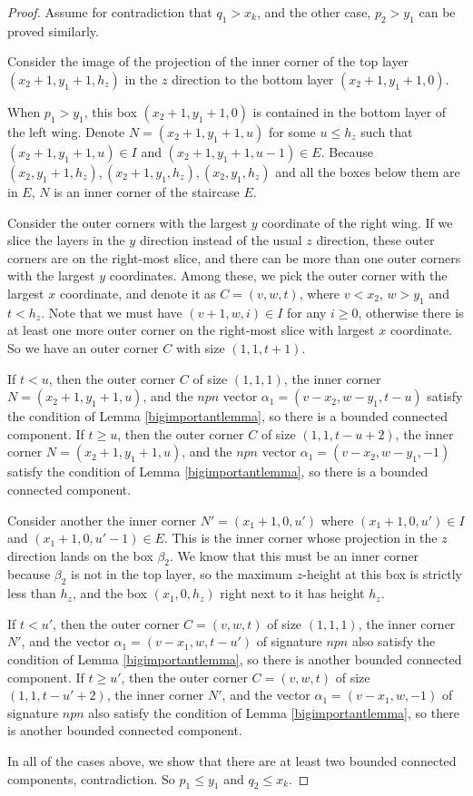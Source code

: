 \documentclass{amsart}[10pt]
\theoremstyle{plain}
\theoremstyle{definition}
\begin{document}
\begin{proof}
Assume for contradiction that $q_1 > x_k$, and the other case, $p_2 > y_1$ can be proved similarly. 

Consider the image of the projection of the inner corner of the top layer $(x_2+1, y_1+1, h_z)$ in the $z$ direction to the bottom layer $(x_2+1, y_1+1,0)$.

When $p_1 > y_1$, this box $(x_2+1, y_1+1,0)$ is contained in the bottom layer of the left wing.  Denote $N=(x_2+1, y_1+1,u)$ for some $u \leq h_z$ such that $(x_2+1, y_1+1,u) \in I$ and $(x_2+1, y_1+1,u-1) \in E$. Because $(x_2, y_1+1,h_z), (x_2+1, y_1,h_z), (x_2, y_1,h_z)$ and all the boxes below them are in $E$, $N$ is an inner corner of the staircase $E$.

Consider the outer corners with the largest $y$ coordinate of the right wing. If we slice the layers in the $y$ direction instead of the usual 
$z$ direction, these outer corners are on the right-most slice, and there can be more than one outer corners with the largest $y$ coordinates. Among these, we pick the outer corner with the largest $x$ coordinate, and denote it as $C=(v, w, t)$, where $v < x_2$, $w>y_1$ and $t <h_z$. Note that we must have $(v+1, w, i) \in I$ for any $i \geq 0$, otherwise there is at least one more outer corner on the right-most slice with largest $x$ coordinate. So we have an outer corner $C$ with size $(1, 1, t+1)$. 

If $t < u$, then the outer corner $C$ of size $(1,1,1)$, the inner corner $N=(x_2+1, y_1+1,u)$, and the $npn$ vector $\alpha_1=(v-x_2, w-y_1, t-u)$ satisfy the condition of Lemma \ref{bigimportantlemma}, so there is a bounded connected component. If $t \geq u$, then the outer corner $C$ of size $(1,1,t-u+2)$, the inner corner $N=(x_2+1, y_1+1,u)$, and the $npn$ vector $\alpha_1=(v-x_2, w-y_1, -1)$ satisfy the condition of Lemma \ref{bigimportantlemma}, so there is a bounded connected component. 

Consider another the inner corner $N'=(x_1+1, 0, u')$ where $(x_1+1, 0, u') \in I$ and $(x_1+1, 0, u'-1) \in E$. This is the inner corner whose projection in the $z$ direction lands on the box $\beta_2$. We know that this must be an inner corner because $\beta_2$ is not in the top layer, so the maximum $z$-height at this box is strictly less than $h_z$, and the box $(x_1, 0, h_z)$ right next to it has height $h_z$.

If $t < u'$, then the outer corner $C=(v, w, t)$ of size $(1,1,1)$, the inner corner $N'$, and the vector $\alpha_1=(v-x_1, w, t-u')$ of signature $npn$ also satisfy the condition of Lemma \ref{bigimportantlemma}, so there is another bounded connected component. If $t \geq u'$, then the outer corner $C=(v, w, t)$ of size $(1,1,t-u'+2)$, the inner corner $N'$, and the vector $\alpha_1=(v-x_1, w, -1)$ of signature $npn$ also satisfy the condition of Lemma \ref{bigimportantlemma}, so there is another bounded connected component. 

In all of the cases above, we show that there are at least two bounded connected components, contradiction. So $p_1 \leq y_1$ and $q_2 \leq x_k$.
\end{proof}
\end{document}
